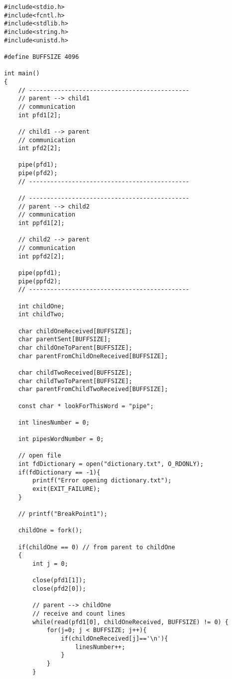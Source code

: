 \documentclass[a4paper,15pt]{article}
\begin{document}
\begin{lstlisting}[style=CStyle, label=some-code, caption=Komunikacja z kilkoma procesami.]
#include<stdio.h>
#include<fcntl.h>
#include<stdlib.h>
#include<string.h>
#include<unistd.h>

#define BUFFSIZE 4096

int main()
{
    // ---------------------------------------------
    // parent --> child1
    // communication
    int pfd1[2];

    // child1 --> parent
    // communication
    int pfd2[2];
    
    pipe(pfd1);
    pipe(pfd2);
    // ---------------------------------------------

    // ---------------------------------------------
    // parent --> child2
    // communication
    int ppfd1[2];

    // child2 --> parent
    // communication
    int ppfd2[2];
    
    pipe(ppfd1);
    pipe(ppfd2);
    // ---------------------------------------------

    int childOne;
    int childTwo;

    char childOneReceived[BUFFSIZE];
    char parentSent[BUFFSIZE];
    char childOneToParent[BUFFSIZE];
    char parentFromChildOneReceived[BUFFSIZE];

    char childTwoReceived[BUFFSIZE];
    char childTwoToParent[BUFFSIZE];
    char parentFromChildTwoReceived[BUFFSIZE];

    const char * lookForThisWord = "pipe";

    int linesNumber = 0;

    int pipesWordNumber = 0;

    // open file
    int fdDictionary = open("dictionary.txt", O_RDONLY);
    if(fdDictionary == -1){
        printf("Error opening dictionary.txt");
        exit(EXIT_FAILURE);
    }

    // printf("BreakPoint1");

    childOne = fork();

    if(childOne == 0) // from parent to childOne
    {
        int j = 0;

        close(pfd1[1]);
        close(pfd2[0]);

        // parent --> childOne
        // receive and count lines
        while(read(pfd1[0], childOneReceived, BUFFSIZE) != 0) {
            for(j=0; j < BUFFSIZE; j++){
                if(childOneReceived[j]=='\n'){
                    linesNumber++;
                }
            }
        }
        

\end{lstlisting}
\end{document}
